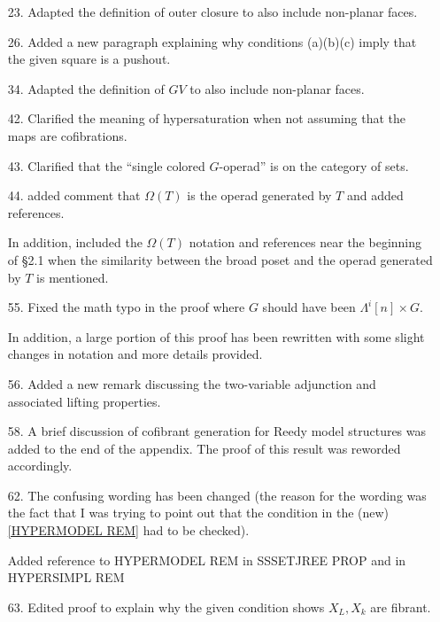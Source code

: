 \documentclass{article}
\begin{document}
\begin{itemize}
\item[23.] Adapted the definition of outer closure to also include non-planar faces.

\item[26.] Added a new paragraph explaining why conditions (a)(b)(c) imply that the given square is a pushout.

\item[34.] Adapted the definition of $GV$ to also include non-planar faces.

\item[42.] Clarified the meaning of hypersaturation when not assuming that the maps are cofibrations.

\item[43.] Clarified that the ``single colored $G$-operad'' is on the category of sets.

\item[44.] added comment that $\Omega(T)$ is the operad generated by $T$ and added references.

In addition, included the $\Omega(T)$ notation and references near the beginning of \S 2.1 when the similarity between the broad poset and the operad generated by $T$ is mentioned.

\item[55.] Fixed the math typo in the proof where $G$ should have been $\Lambda^i[n] \times G$.

In addition, a large portion of this proof has been rewritten with some slight changes in notation and more details provided.

\item[56.] Added a new remark discussing the two-variable adjunction and associated lifting properties.

\item[58.] A brief discussion of cofibrant generation for Reedy model structures was added to the end of the appendix. The proof of this result was reworded accordingly.

\item[62.] The confusing wording has been changed (the reason for the wording was the fact that I was trying to point out that the condition in the (new) \ref{HYPERMODEL REM} had to be checked).

Added reference to HYPERMODEL REM in SSSETJREE PROP and in HYPERSIMPL REM

\item[63.] Edited proof to explain why the given condition shows $X_L,X_k $ are fibrant.


\end{itemize}
\end{document}
